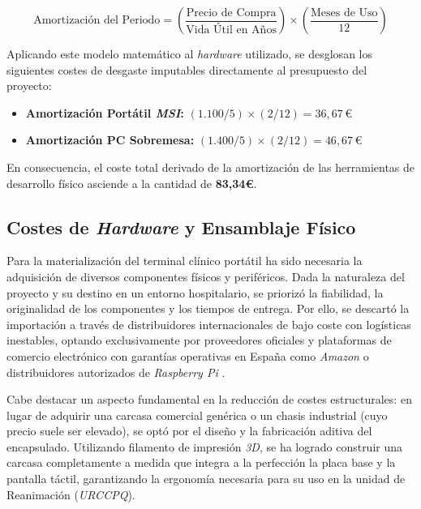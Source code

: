 \begin{equation}
\text{Amortización del Periodo} = \left( \frac{\text{Precio de Compra}}{\text{Vida Útil en Años}} \right) \times \left( \frac{\text{Meses de Uso}}{12} \right)
\label{eq:amortizacion}
\end{equation}

Aplicando este modelo matemático al \textit{hardware} utilizado, se desglosan los siguientes costes de desgaste imputables directamente al presupuesto del proyecto:

\begin{itemize}
    \item \textbf{Amortización Portátil \textit{MSI}:} $(1.100 / 5) \times (2 / 12) = 36,67\,\text{€}$
    \item \textbf{Amortización PC Sobremesa:} $(1.400 / 5) \times (2 / 12) = 46,67\,\text{€}$
\end{itemize}

En consecuencia, el coste total derivado de la amortización de las herramientas de desarrollo físico asciende a la cantidad de \textbf{83,34€}.

\subsection{Costes de \textit{Hardware} y Ensamblaje Físico}
Para la materialización del terminal clínico portátil ha sido necesaria la adquisición de diversos componentes físicos y periféricos. Dada la naturaleza del proyecto y su destino en un entorno hospitalario, se priorizó la fiabilidad, la originalidad de los componentes y los tiempos de entrega. Por ello, se descartó la importación a través de distribuidores internacionales de bajo coste con logísticas inestables, optando exclusivamente por proveedores oficiales y plataformas de comercio electrónico con garantías operativas en España como \textit{Amazon} \cite{amazon} o distribuidores autorizados de \textit{Raspberry Pi} \cite{raspshop}.

Cabe destacar un aspecto fundamental en la reducción de costes estructurales: en lugar de adquirir una carcasa comercial genérica o un chasis industrial (cuyo precio suele ser elevado), se optó por el diseño y la fabricación aditiva del encapsulado. Utilizando filamento de impresión \textit{3D}, se ha logrado construir una carcasa completamente a medida que integra a la perfección la placa base y la pantalla táctil, garantizando la ergonomía necesaria para su uso en la unidad de Reanimación (\textit{URCCPQ}). 

